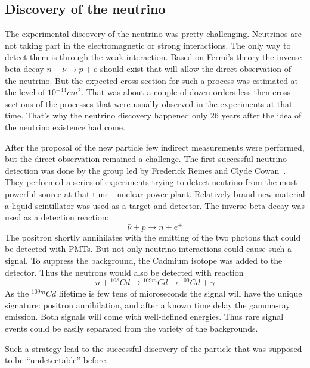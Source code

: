 \documentclass[../main.tex]{subfiles}
\begin{document}
\subsection{Discovery of the neutrino}
The experimental discovery of the neutrino was pretty challenging. Neutrinos are not taking part in the electromagnetic or strong interactions. The only way to detect them is through the weak interaction. Based on Fermi's theory the inverse beta decay $n+\nu\to p+e$ should exist that will allow the direct observation of the neutrino. But the expected cross-section for such a process was estimated at the level of $10^{-44} cm^2$. That was about a couple of dozen orders less then cross-sections of the processes that were usually observed in the experiments at that time. That's why the neutrino discovery happened only 26 years after the idea of the neutrino existence had come.

After the proposal of the new particle few indirect measurements were performed, but the direct observation remained a challenge. The first successful neutrino detection was done by the group led by Frederick Reines and Clyde Cowan~\cite{Cowan1956}. They performed a series of experiments trying to detect neutrino from the most powerful source at that time - nuclear power plant. Relatively brand new material a liquid scintillator was used as a target and detector. The inverse beta decay was used as a detection reaction:
\begin{equation}
\bar{\nu}+p\to n+e^+
\end{equation}
The positron shortly annihilates with the emitting of the two photons that could be detected with PMTs. But not only neutrino interactions could cause such a signal. To suppress the background, the Cadmium isotope was added to the detector. Thus the neutrons would also be detected with reaction
\begin{equation}
n+{}^{108}Cd\to{}^{109m}Cd\to{}^{109}Cd+\gamma
\end{equation}
As the ${}^{109m}Cd$ lifetime is few tens of microseconds the signal will have the unique signature: positron annihilation, and after a known time delay the gamma-ray emission. Both signals will come with well-defined energies. Thus rare signal events could be easily separated from the variety of the backgrounds.

Such a strategy lead to the successful discovery of the particle that was supposed to be ``undetectable'' before.
\end{document}
